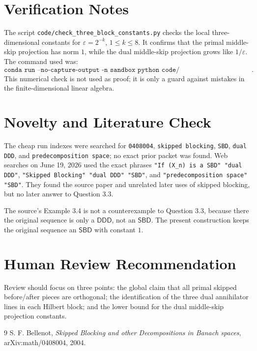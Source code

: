 \documentclass[11pt]{article}
\newcommand{\SBD}{\mathsf{SBD}}
\newcommand{\DDD}{\mathsf{DDD}}
\begin{document}
\section*{Verification Notes}

The script \texttt{code/check\_three\_block\_constants.py} checks the local
three-dimensional constants for \(\varepsilon=2^{-k}\), \(1\le k\le8\).  It
confirms that the primal middle-skip projection has norm \(1\), while the dual
middle-skip projection grows like \(1/\varepsilon\).  The command used was:
\[
\texttt{conda run --no-capture-output -n sandbox python code/check\_three\_block\_constants.py}.
\]
This numerical check is not used as proof; it is only a guard against mistakes
in the finite-dimensional linear algebra.

\section*{Novelty and Literature Check}

The cheap run indexes were searched for \texttt{0408004}, \texttt{skipped
blocking}, \texttt{SBD}, \texttt{dual DDD}, and \texttt{predecomposition
space}; no exact prior packet was found.  Web searches on June 19, 2026 used
the exact phrases \texttt{"If (X\_n) is a SBD" "dual DDD"},
\texttt{"Skipped Blocking" "dual DDD" "SBD"}, and
\texttt{"predecomposition space" "SBD"}.  They found the source paper and
unrelated later uses of skipped blocking, but no later answer to Question 3.3.

The source's Example 3.4 is not a counterexample to Question 3.3, because there
the original sequence is only a \(\DDD\), not an \(\SBD\).  The present
construction keeps the original sequence an \(\SBD\) with constant \(1\).

\section*{Human Review Recommendation}

Review should focus on three points: the global claim that all primal skipped
before/after pieces are orthogonal; the identification of the three dual
annihilator lines in each Hilbert block; and the lower bound for the dual
middle-skip projection constants.

\begin{thebibliography}{9}
S. F. Bellenot,
\emph{Skipped Blocking and other Decompositions in Banach spaces},
arXiv:math/0408004, 2004.
\end{thebibliography}
\end{document}
